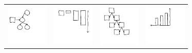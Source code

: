 \documentclass{article}
\begin{document}
\newcommand{\exampleImageSize}{2cm}
\begin{figure}[h]
  \begin{minipage}[t]{0.7\linewidth}  
\begin{tabular}{llll}
  \includegraphics[width = \exampleImageSize]{figures/expert-60.png}&
  \includegraphics[width = \exampleImageSize]{figures/expert-5.png}&
    \includegraphics[width = \exampleImageSize]{figures/expert-17.png}&
    \includegraphics[width = \exampleImageSize]{figures/expert-58.png}\\

\end{tabular}
\end{minipage}
\end{figure}
\end{document}
